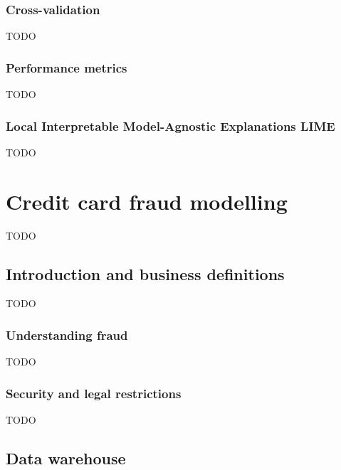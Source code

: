\documentclass[12pt, a4paper]{report}
\theoremstyle{plain}
\theoremstyle{plain}
\theoremstyle{remark}
\begin{document}
\subsection{Cross-validation}
\label{subsec:mlt_me_cross_validation}

TODO

\subsection{Performance metrics}
\label{subsec:mlt_me_performance_metric}

TODO

\subsection{Local Interpretable Model-Agnostic Explanations LIME}
\label{subsec:mlt_me_local_interpretable_model_agnostice_explanations_lime}

TODO

\chapter{Credit card fraud modelling}
\label{chap:credit_card_fraud_modelling}

TODO

\section{Introduction and business definitions}
\label{sec:ccfm_introductions_and_business_definitions}

TODO

\subsection{Understanding fraud}
\label{subsec:ccfm_iabd_understanding_fraud}

TODO

\subsection{Security and legal restrictions}
\label{subsec:ccfm_iabd_security_and_legal_restrictions}

TODO

\section{Data warehouse}
\label{sec:ccfm_data_warehouse}
\end{document}
